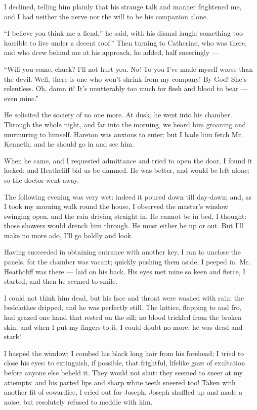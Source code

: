 \par I declined, telling him plainly that his strange talk and manner frightened me, and I had neither the nerve nor the will to be his companion alone.
\par “I believe you think me a fiend,” he said, with his dismal laugh: something too horrible to live under a decent roof.” Then turning to Catherine, who was there, and who drew behind me at his approach, he added, half sneeringly —
\par “Will you come, chuck? I'll not hurt you. No! To you I've made myself worse than the devil. Well, there is one who won't shrink from my company! By God! She's relentless. Oh, damn it! It's unutterably too much for flesh and blood to bear — even mine.”
\par He solicited the society of no one more. At dusk, he went into his chamber. Through the whole night, and far into the morning, we heard him groaning and murmuring to himself. Hareton was anxious to enter; but I bade him fetch Mr. Kenneth, and he should go in and see him.
\par When he came, and I requested admittance and tried to open the door, I found it locked; and Heathcliff bid us be damned. He was better, and would be left alone; so the doctor went away.
\par The following evening was very wet: indeed it poured down till day-dawn; and, as I took my morning walk round the house, I observed the master's window swinging open, and the rain driving straight in. He cannot be in bed, I thought: those showers would drench him through. He must either be up or out. But I'll make no more ado, I'll go boldly and look.
\par Having succeeded in obtaining entrance with another key, I ran to unclose the panels, for the chamber was vacant; quickly pushing them aside, I peeped in. Mr. Heathcliff was there — laid on his back. His eyes met mine so keen and fierce, I started; and then he seemed to smile.
\par I could not think him dead, but his face and throat were washed with rain; the bedclothes dripped, and he was perfectly still. The lattice, flapping to and fro, had grazed one hand that rested on the sill; no blood trickled from the broken skin, and when I put my fingers to it, I could doubt no more: he was dead and stark!
\par I hasped the window; I combed his black long hair from his forehead; I tried to close his eyes: to extinguish, if possible, that frightful, lifelike gaze of exultation before anyone else beheld it. They would not shut: they seemed to sneer at my attempts: and his parted lips and sharp white teeth sneered too! Taken with another fit of cowardice, I cried out for Joseph. Joseph shuffled up and made a noise; but resolutely refused to meddle with him.
